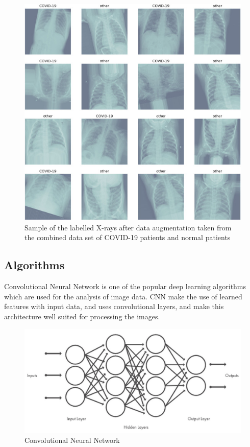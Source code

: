 \begin{figure}[!h]
    \centering
        \includegraphics[width=\textwidth]{assets/chest.png}
    \caption{Sample of the labelled X-rays after data augmentation taken from the combined data set of COVID-19 patients and normal patients }
    \label{chest_image}
\end{figure}

\subsection{Algorithms}

Convolutional Neural Network is one of the popular deep learning algorithms which are used for the analysis of image data. CNN make the use of learned features with input data, and uses convolutional layers, and make this architecture well suited for processing the images. 

 

 
\begin{figure}[!h]
    \centering
    \includegraphics[width=\textwidth]{assets/cnn1.png}
    \caption{Convolutional Neural Network}
\end{figure}
 

